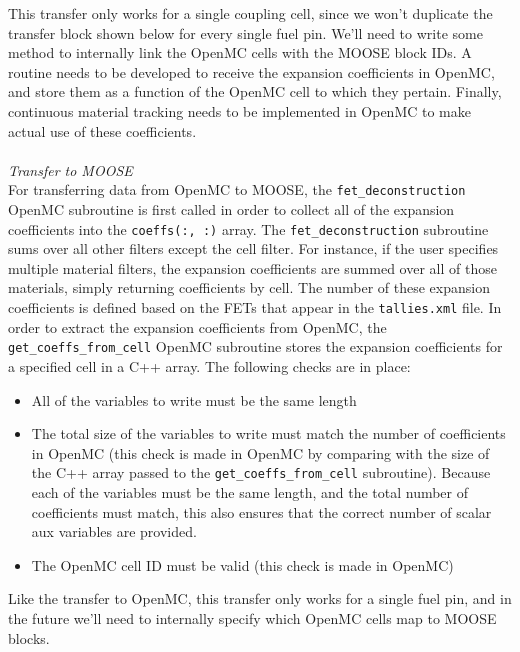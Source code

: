 \documentclass[10pt]{article}
\numberwithin{equation}{section} %
\begin{document}
\color{magenta}
This transfer only works for a single coupling cell, since we won't duplicate the transfer block shown below for every single fuel pin. We'll need to write some method to internally link the OpenMC cells with the MOOSE block IDs. A routine needs to be developed to receive the expansion coefficients in OpenMC, and store them as a function of the OpenMC cell to which they pertain. Finally, continuous material tracking needs to be implemented in OpenMC to make actual use of these coefficients.
\color{black}
\\\\
{\it Transfer to MOOSE}\\
For transferring data from OpenMC to MOOSE, the {\tt fet\_deconstruction} OpenMC subroutine is first called in order to collect all of the expansion coefficients into the {\tt coeffs(:, :)} array. The {\tt fet\_deconstruction} subroutine sums over all other filters except the cell filter. For instance, if the user specifies multiple material filters, the expansion coefficients are summed over all of those materials, simply returning coefficients by cell. The number of these expansion coefficients is defined based on the FETs that appear in the {\tt tallies.xml} file. In order to extract the expansion coefficients from OpenMC, the {\tt get\_coeffs\_from\_cell} OpenMC subroutine stores the expansion coefficients for a specified cell in a C++ array. The following checks are in place:

\begin{itemize}
\item All of the variables to write must be the same length
\item The total size of the variables to write must match the number of coefficients in OpenMC (this check is made in OpenMC by comparing with the size of the C++ array passed to the {\tt get\_coeffs\_from\_cell} subroutine). Because each of the variables must be the same length, and the total number of coefficients must match, this also ensures that the correct number of scalar aux variables are provided.
\item The OpenMC cell ID must be valid (this check is made in OpenMC)
\end{itemize}

\color{magenta}
Like the transfer to OpenMC, this transfer only works for a single fuel pin, and in the future we'll need to internally specify which OpenMC cells map to MOOSE blocks.
\color{black}
\end{document}
